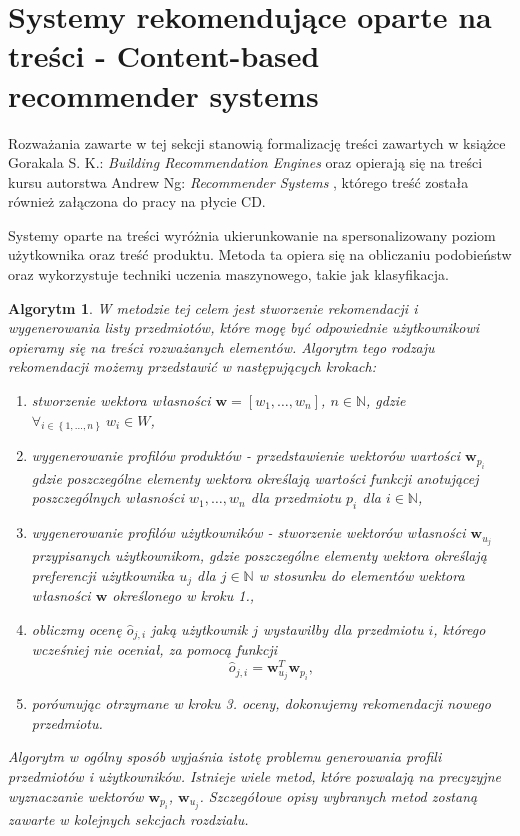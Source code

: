 \documentclass[12pt,a4paper]{report}
\newtheorem{algorytm}[df]{Algorytm}
\newcommand{\set}[1]{\left\lbrace {#1} \right\rbrace}
\newcommand{\setN}{\mathbb{N}}
\newcommand{\setWlasnosci}{\mathit{W}}
\begin{document}
\section{Systemy rekomendujące oparte na treści - Content-based recommender systems}
Rozważania zawarte w tej sekcji stanowią formalizację treści zawartych w książce Gorakala S. K.: \textit{Building Recommendation Engines} {\citep[Sec 3]{bre}} oraz opierają się na treści kursu autorstwa Andrew Ng: \textit{Recommender Systems} {\citep{rs}}, którego treść została również załączona do pracy na płycie CD.
\bigskip

Systemy oparte na treści wyróżnia ukierunkowanie na spersonalizowany poziom użytkownika oraz treść produktu. Metoda ta opiera się na obliczaniu podobieństw oraz wykorzystuje techniki uczenia maszynowego, takie jak klasyfikacja.

\begin{algorytm}
W metodzie tej celem jest stworzenie rekomendacji i wygenerowania listy przedmiotów, które mogę być odpowiednie użytkownikowi opieramy się na treści rozważanych elementów. Algorytm tego rodzaju rekomendacji możemy przedstawić w następujących krokach:
\begin{enumerate}
\item stworzenie wektora własności $\mathbf{w} = [w_1, \ldots, w_n]$, $n \in \setN$, gdzie $\forall_{i \in \set{1, \ldots, n}} \: w_i \in \setWlasnosci$,

\item wygenerowanie profilów produktów - przedstawienie wektorów wartości $\mathbf{w}_{p_i}$ gdzie poszczególne elementy wektora określają wartości funkcji anotującej poszczególnych własności $w_1, \ldots, w_n$ dla przedmiotu $p_i$ dla $i \in \setN$,

\item wygenerowanie profilów użytkowników - stworzenie wektorów własności $\mathbf{w}_{u_j}$ przypisanych użytkownikom, gdzie poszczególne elementy wektora określają preferencji użytkownika $u_j$ dla $j \in \setN$ w stosunku do elementów wektora własności $\mathbf{w}$ określonego w kroku 1.,

\item obliczmy ocenę $\widehat{o}_{j,i}$ jaką użytkownik $j$ wystawiłby dla przedmiotu $i$, którego wcześniej nie oceniał, za pomocą funkcji
$$
\widehat{o}_{j,i} = \mathbf{w}_{u_j}^T \mathbf{w}_{p_i},
$$

\item porównując otrzymane w kroku 3. oceny, dokonujemy rekomendacji nowego przedmiotu.
\end{enumerate}

Algorytm w ogólny sposób wyjaśnia istotę problemu generowania profili przedmiotów i użytkowników.
Istnieje wiele metod, które pozwalają na precyzyjne wyznaczanie wektorów $\mathbf{w}_{p_i}$, $\mathbf{w}_{u_j}$.
Szczegółowe opisy wybranych metod zostaną zawarte w kolejnych sekcjach rozdziału.
\end{algorytm}
\end{document}
